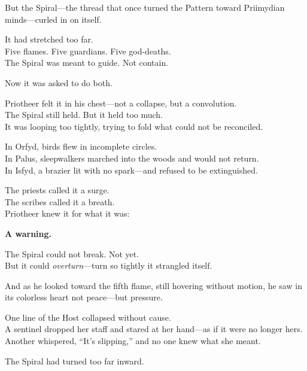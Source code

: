 \documentclass[9pt]{article}
\begin{document}
\vspace{0.5em}
But the Spiral---the thread that once turned the Pattern toward Priimydian minds---curled in on itself.

\vspace{0.5em}
It had stretched too far.\\
Five flames. Five guardians. Five god-deaths.\\
The Spiral was meant to guide. Not contain.

\vspace{0.5em}
Now it was asked to do both.

\vspace{0.5em}
Priotheer felt it in his chest---not a collapse, but a convolution.\\
The Spiral still held. But it held too much.\\
It was looping too tightly, trying to fold what could not be reconciled.

\vspace{0.5em}
In Orfyd, birds flew in incomplete circles.\\
In Palus, sleepwalkers marched into the woods and would not return.\\
In Isfyd, a brazier lit with no spark---and refused to be extinguished.

\vspace{0.5em}
The priests called it a surge.\\
The scribes called it a breath.\\
Priotheer knew it for what it was:

\vspace{0.5em}
\textbf{A warning.}

\vspace{0.5em}
The Spiral could not break. Not yet.\\
But it could \textit{overturn}---turn so tightly it strangled itself.

\vspace{0.5em}
And as he looked toward the fifth flame, still hovering without motion, he saw in its colorless heart not peace---but pressure.

\vspace{0.5em}
One line of the Host collapsed without cause.\\
A sentinel dropped her staff and stared at her hand---as if it were no longer hers.\\
Another whispered, ``It’s slipping,'' and no one knew what she meant.

\vspace{0.5em}
The Spiral had turned too far inward.
\end{document}
